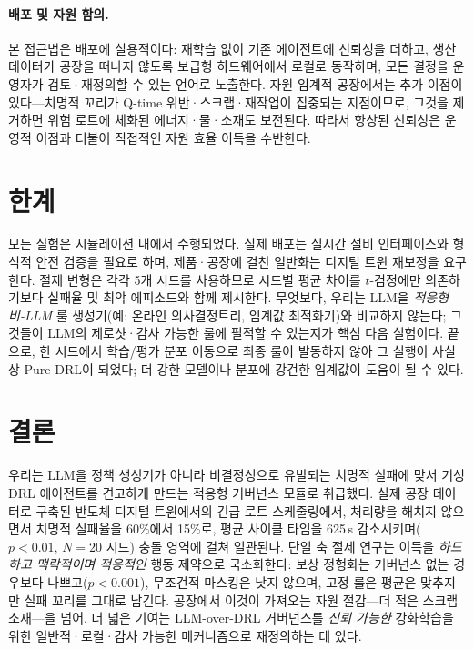 \documentclass[letterpaper]{article} %
\begin{document}
\paragraph{배포 및 자원 함의.}
본 접근법은 배포에 실용적이다: 재학습 없이 기존 에이전트에 신뢰성을 더하고, 생산
데이터가 공장을 떠나지 않도록 보급형 하드웨어에서 로컬로 동작하며, 모든 결정을
운영자가 검토·재정의할 수 있는 언어로 노출한다. 자원 임계적 공장에서는 추가 이점이
있다---치명적 꼬리가 Q-time 위반·스크랩·재작업이 집중되는 지점이므로, 그것을 제거하면
위험 로트에 체화된 에너지·물·소재도 보전된다. 따라서 향상된 신뢰성은 운영적 이점과
더불어 직접적인 자원 효율 이득을 수반한다.

\section{한계}
\label{sec:limitations}

모든 실험은 시뮬레이션 내에서 수행되었다. 실제 배포는 실시간 설비 인터페이스와
형식적 안전 검증을 필요로 하며, 제품·공장에 걸친 일반화는 디지털 트윈 재보정을
요구한다. 절제 변형은 각각 5개 시드를 사용하므로 시드별 평균 차이를 $t$-검정에만
의존하기보다 실패율 및 최악 에피소드와 함께 제시한다. 무엇보다, 우리는 LLM을
\emph{적응형 비-LLM} 룰 생성기(예: 온라인 의사결정트리, 임계값 최적화기)와 비교하지
않는다; 그것들이 LLM의 제로샷·감사 가능한 룰에 필적할 수 있는지가 핵심 다음 실험이다.
끝으로, 한 시드에서 학습/평가 분포 이동으로 최종 룰이 발동하지 않아 그 실행이 사실상
Pure DRL이 되었다; 더 강한 모델이나 분포에 강건한 임계값이 도움이 될 수 있다.

\section{결론}

우리는 LLM을 정책 생성기가 아니라 비결정성으로 유발되는 치명적 실패에 맞서 기성 DRL
에이전트를 견고하게 만드는 적응형 거버넌스 모듈로 취급했다. 실제 공장 데이터로 구축된
반도체 디지털 트윈에서의 긴급 로트 스케줄링에서, 처리량을 해치지 않으면서 치명적
실패율을 60\%에서 15\%로, 평균 사이클 타임을 625\,s 감소시키며($p<0.01$, $N{=}20$
시드) 충돌 영역에 걸쳐 일관된다. 단일 축 절제 연구는 이득을 \emph{하드하고 맥락적이며
적응적인} 행동 제약으로 국소화한다: 보상 정형화는 거버넌스 없는 경우보다 나쁘고($p<0.001$),
무조건적 마스킹은 낫지 않으며, 고정 룰은 평균은 맞추지만 실패 꼬리를 그대로 남긴다.
공장에서 이것이 가져오는 자원 절감---더 적은 스크랩 소재---을 넘어, 더 넓은 기여는
LLM-over-DRL 거버넌스를 \emph{신뢰 가능한} 강화학습을 위한 일반적·로컬·감사 가능한
메커니즘으로 재정의하는 데 있다.


\end{document}

